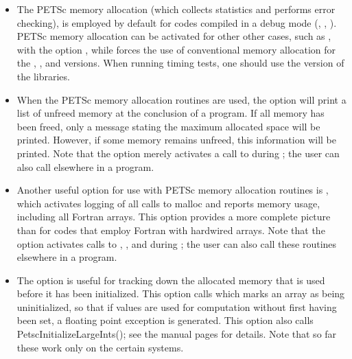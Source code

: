  
\begin{itemize}
\item The PETSc memory allocation (which collects statistics and performs
error checking), is employed by default for codes compiled in a
debug mode (, , ).
PETSc memory allocation can be activated for other other cases, such
as , with the option , while  forces the use of conventional memory allocation for the
, , and  versions.
When running timing tests, one should use  
the  version of the libraries.

 
\item When the PETSc memory allocation routines are used, the option 
 will print a list of unfreed memory at the conclusion of a
program.  If all memory has been freed, only a message stating
the maximum allocated space will be printed.  However, if some memory
remains unfreed, this information will be printed.  Note that the
option  merely activates a call to  during
; the user can also call  elsewhere
in a program.

 
 
\item Another useful option for use with PETSc memory allocation
routines is , which activates logging of all calls
to malloc and reports memory usage, including all Fortran arrays.
This option provides a more complete picture than  for
codes that employ Fortran with hardwired arrays.  Note that the option
 activates calls to , , and  during ; the user can also call these routines elsewhere in a
program.

 
\item The option  is useful for tracking down the
allocated memory that is used before it has been initialized.  This
option calls  which marks an array as being
uninitialized, so that if values are used for computation without
first having been set, a floating point exception is generated.  This
option also calls {PetscInitializeLargeInts()}; see the manual pages for
details.  Note that so far these work only on the certain systems.

\end{itemize}

